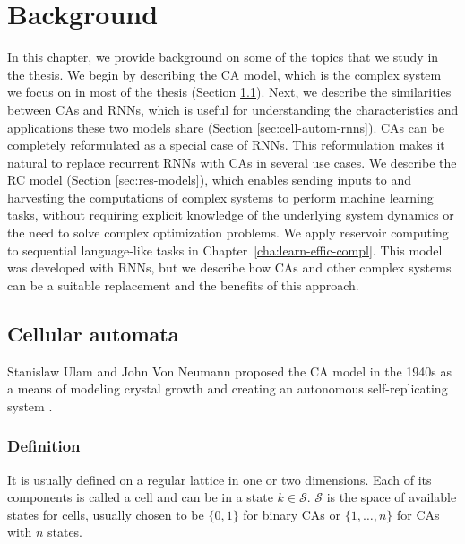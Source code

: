 \chapter{Background}
\label{cha:background}

In this chapter, we provide background on some of the topics that we study in the
thesis. We begin by describing the \acf{CA} model, which is the complex system
we focus on in most of the thesis (Section \ref{sec:cellular-automata-sec}).
Next, we describe the similarities between \acp{CA} and \acfp{RNN}, which is
useful for understanding the characteristics and applications these two models
share (Section \ref{sec:cell-autom-rnns}). \acp{CA} can be completely reformulated 
as a special case of \acp{RNN}. This reformulation makes it natural to replace 
recurrent \acp{RNN} with \acp{CA} in several use cases. We
describe the \acf{RC} model (Section \ref{sec:res-models}), which enables
sending inputs to and harvesting the computations of complex systems to perform machine learning tasks, without requiring explicit knowledge of the underlying system dynamics or the need to solve complex optimization problems.
 We apply reservoir computing to sequential language-like tasks in Chapter~\ref{cha:learn-effic-compl}. This model was
developed with \acp{RNN}, but we describe how \acp{CA} and other complex systems
can be a suitable replacement and the benefits of this approach.

\section{Cellular automata}\label{sec:cellular-automata-sec}

Stanislaw Ulam and John Von
Neumann proposed the \ac{CA} model in the 1940s as a means 
of modeling crystal growth and creating an autonomous self-replicating system
\parencite{vonneumannTheorySelfreproducingAutomata1966}.

\subsection{Definition}\label{sec:definition}
It is usually defined on a regular lattice in one or two dimensions. Each of its
components is called a cell and can be in a state $k \in \mathcal{S}$. $\mathcal{S}$ is the space of
available states for cells, usually chosen to be $\{0, 1\}$ for binary
\acp{CA} or $\{1, \ldots, n\}$ for \acp{CA} with $n$ states.

